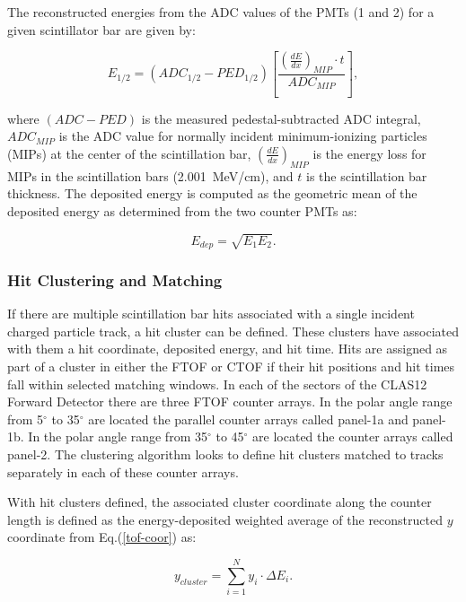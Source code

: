 The reconstructed energies from the ADC values of the PMTs (1 and 2) for a given scintillator bar are given by:

\begin{equation}
E_{1/2} = (ADC_{1/2} - PED_{1/2}) \left [ \frac{\left( \frac{dE}{dx} \right )_{MIP} \cdot t}{ADC_{MIP}} \right ],
\end{equation}

\noindent
where $(ADC-PED)$ is the measured pedestal-subtracted ADC integral, $ADC_{MIP}$ is the ADC value for
normally incident minimum-ionizing particles (MIPs) at the center of the scintillation bar,
$\left( \frac{dE}{dx} \right)_{MIP}$ is the energy loss for MIPs in the scintillation bars (2.001~MeV/cm), and
$t$ is the scintillation bar thickness. The deposited energy is computed as the geometric mean of the deposited
energy as determined from the two counter PMTs as:

\begin{equation}
E_{dep} = \sqrt{E_1 E_2}.
\end{equation}

\subsubsection{Hit Clustering and Matching}
\label{sec:tof-cluster}

If there are multiple scintillation bar hits associated with a single incident charged particle track, a hit cluster
can be defined. These clusters have associated with them a hit coordinate, deposited energy, and hit time. Hits
are assigned as part of a cluster in either the FTOF or CTOF if their hit positions and hit times fall within selected
matching windows. In each of the sectors of the CLAS12 Forward Detector there are three FTOF counter arrays. In
the polar angle range from 5$^\circ$ to 35$^\circ$ are located the parallel counter arrays called panel-1a and panel-1b.
In the polar angle range from 35$^\circ$ to 45$^\circ$ are located the counter arrays called panel-2. The clustering
algorithm looks to define hit clusters matched to tracks separately in each of these counter arrays.

With hit clusters defined, the associated cluster coordinate along the counter length is defined as the
energy-deposited weighted average of the reconstructed $y$ coordinate from Eq.(\ref{tof-coor}) as:

\begin{equation}
y_{cluster} = \sum_{i=1}^{N} y_i \cdot \Delta E_i.
\end{equation}

